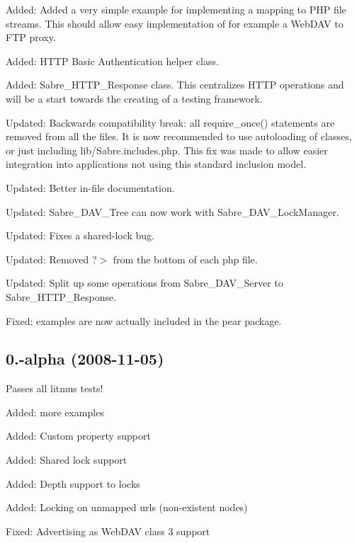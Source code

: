\begin{DoxyItemize}
\item Added\+: Added a very simple example for implementing a mapping to P\+HP file streams. This should allow easy implementation of for example a Web\+D\+AV to F\+TP proxy.
\item Added\+: H\+T\+TP Basic Authentication helper class.
\item Added\+: Sabre\+\_\+\+H\+T\+T\+P\+\_\+\+Response class. This centralizes H\+T\+TP operations and will be a start towards the creating of a testing framework.
\item Updated\+: Backwards compatibility break\+: all require\+\_\+once() statements are removed from all the files. It is now recommended to use autoloading of classes, or just including lib/\+Sabre.\+includes.\+php. This fix was made to allow easier integration into applications not using this standard inclusion model.
\item Updated\+: Better in-\/file documentation.
\item Updated\+: Sabre\+\_\+\+D\+A\+V\+\_\+\+Tree can now work with Sabre\+\_\+\+D\+A\+V\+\_\+\+Lock\+Manager.
\item Updated\+: Fixes a shared-\/lock bug.
\item Updated\+: Removed ?$>$ from the bottom of each php file.
\item Updated\+: Split up some operations from Sabre\+\_\+\+D\+A\+V\+\_\+\+Server to Sabre\+\_\+\+H\+T\+T\+P\+\_\+\+Response.
\item Fixed\+: examples are now actually included in the pear package.
\end{DoxyItemize}

\subsection*{0.-\/alpha (2008-\/11-\/05) }


\begin{DoxyItemize}
\item Passes all litmus tests!
\item Added\+: more examples
\item Added\+: Custom property support
\item Added\+: Shared lock support
\item Added\+: Depth support to locks
\item Added\+: Locking on unmapped urls (non-\/existent nodes)
\item Fixed\+: Advertising as Web\+D\+AV class 3 support
\end{DoxyItemize}

